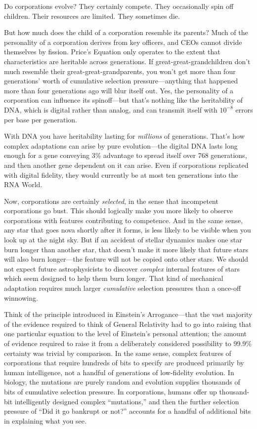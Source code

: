 {{
 Do corporations evolve? They certainly compete. They occasionally
spin off children. Their resources are limited. They sometimes die.}

{
 But how much does the child of a corporation resemble its parents?
Much of the personality of a corporation derives from key officers, and
CEOs cannot divide themselves by fission. Price's
Equation only operates to the extent that characteristics are heritable
across generations. If great-great-grandchildren don't
much resemble their great-great-grandparents, you won't
get more than four generations' worth of cumulative
selection pressure---anything that happened more than four generations
ago will blur itself out. Yes, the personality of a corporation can
influence its spinoff---but that's nothing like the
heritability of DNA, which is digital rather than analog, and can
transmit itself with $10^{-8}$ errors per base per
generation.}

{
 With DNA you have heritability lasting for \textit{millions} of
generations. That's how complex adaptations can arise
by pure evolution---the digital DNA lasts long enough for a gene
conveying 3\% advantage to spread itself over 768 generations, and then
another gene dependent on it can arise. Even if corporations replicated
with digital fidelity, they would currently be at most ten generations
into the RNA World.}

{
 Now, corporations are certainly \textit{selected}, in the sense
that incompetent corporations go bust. This should logically make you
more likely to observe corporations with features contributing to
competence. And in the same sense, any star that goes nova shortly
after it forms, is less likely to be visible when you look up at the
night sky. But if an accident of stellar dynamics makes one star burn
longer than another star, that doesn't make it more
likely that future stars will also burn longer---the feature will not
be copied onto other stars. We should not expect future astrophysicists
to discover \textit{complex} internal features of stars which seem
designed to help them burn longer. That kind of mechanical adaptation
requires much larger \textit{cumulative} selection pressures than a
once-off winnowing.}

{
 Think of the principle introduced in Einstein's
Arrogance---that the vast majority of the evidence required to think of
General Relativity had to go into raising that one particular equation
to the level of Einstein's personal attention; the
amount of evidence required to raise it from a deliberately considered
possibility to 99.9\% certainty was trivial by comparison. In the same
sense, complex features of corporations that require hundreds of bits
to specify are produced primarily by human intelligence, not a handful
of generations of low-fidelity evolution. In biology, the mutations are
purely random and evolution supplies thousands of bits of cumulative
selection pressure. In corporations, humans offer up thousand-bit
intelligently designed complex
``mutations,'' and then the further
selection pressure of ``Did it go bankrupt or
not?'' accounts for a handful of additional bits in
explaining what you see.}

}
